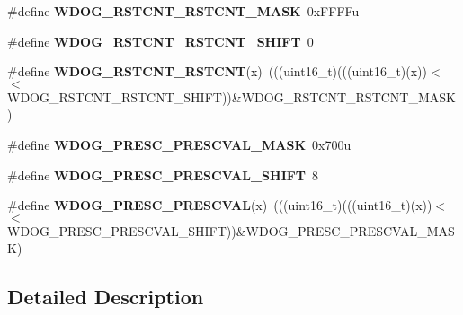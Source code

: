 \begin{DoxyCompactItemize}
\item 
\#define {\bfseries W\+D\+O\+G\+\_\+\+R\+S\+T\+C\+N\+T\+\_\+\+R\+S\+T\+C\+N\+T\+\_\+\+M\+A\+SK}~0x\+F\+F\+F\+Fu\hypertarget{group__WDOG__Register__Masks_ga1cb55a509947b315d216ed9d822a4967}{}\label{group__WDOG__Register__Masks_ga1cb55a509947b315d216ed9d822a4967}

\item 
\#define {\bfseries W\+D\+O\+G\+\_\+\+R\+S\+T\+C\+N\+T\+\_\+\+R\+S\+T\+C\+N\+T\+\_\+\+S\+H\+I\+FT}~0\hypertarget{group__WDOG__Register__Masks_gaf2ecbd74ca7b1ba60bc7b89de17b97a6}{}\label{group__WDOG__Register__Masks_gaf2ecbd74ca7b1ba60bc7b89de17b97a6}

\item 
\#define {\bfseries W\+D\+O\+G\+\_\+\+R\+S\+T\+C\+N\+T\+\_\+\+R\+S\+T\+C\+NT}(x)~(((uint16\+\_\+t)(((uint16\+\_\+t)(x))$<$$<$W\+D\+O\+G\+\_\+\+R\+S\+T\+C\+N\+T\+\_\+\+R\+S\+T\+C\+N\+T\+\_\+\+S\+H\+I\+FT))\&W\+D\+O\+G\+\_\+\+R\+S\+T\+C\+N\+T\+\_\+\+R\+S\+T\+C\+N\+T\+\_\+\+M\+A\+SK)\hypertarget{group__WDOG__Register__Masks_ga7ca7ac27fe2491ac993344daf567aadf}{}\label{group__WDOG__Register__Masks_ga7ca7ac27fe2491ac993344daf567aadf}

\item 
\#define {\bfseries W\+D\+O\+G\+\_\+\+P\+R\+E\+S\+C\+\_\+\+P\+R\+E\+S\+C\+V\+A\+L\+\_\+\+M\+A\+SK}~0x700u\hypertarget{group__WDOG__Register__Masks_gaeadae4c65653a3302e69526730af1596}{}\label{group__WDOG__Register__Masks_gaeadae4c65653a3302e69526730af1596}

\item 
\#define {\bfseries W\+D\+O\+G\+\_\+\+P\+R\+E\+S\+C\+\_\+\+P\+R\+E\+S\+C\+V\+A\+L\+\_\+\+S\+H\+I\+FT}~8\hypertarget{group__WDOG__Register__Masks_gaa93b6acb20a8e20b687f05b8ced452c1}{}\label{group__WDOG__Register__Masks_gaa93b6acb20a8e20b687f05b8ced452c1}

\item 
\#define {\bfseries W\+D\+O\+G\+\_\+\+P\+R\+E\+S\+C\+\_\+\+P\+R\+E\+S\+C\+V\+AL}(x)~(((uint16\+\_\+t)(((uint16\+\_\+t)(x))$<$$<$W\+D\+O\+G\+\_\+\+P\+R\+E\+S\+C\+\_\+\+P\+R\+E\+S\+C\+V\+A\+L\+\_\+\+S\+H\+I\+FT))\&W\+D\+O\+G\+\_\+\+P\+R\+E\+S\+C\+\_\+\+P\+R\+E\+S\+C\+V\+A\+L\+\_\+\+M\+A\+SK)\hypertarget{group__WDOG__Register__Masks_ga13265fa90a567f7d142cd9cf3a5c0118}{}\label{group__WDOG__Register__Masks_ga13265fa90a567f7d142cd9cf3a5c0118}

\end{DoxyCompactItemize}


\subsection{Detailed Description}
